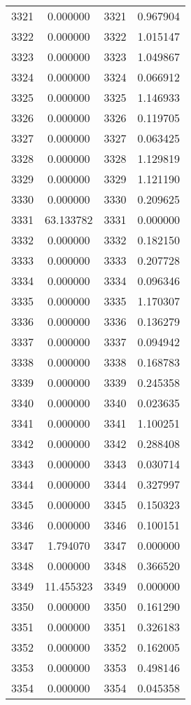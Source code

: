 \documentclass[12pt]{article}
\begin{document}
\begin{longtable}{@{}cccc@{}}
3321 & 0.000000 & 3321 & 0.967904 \\
3322 & 0.000000 & 3322 & 1.015147 \\
3323 & 0.000000 & 3323 & 1.049867 \\
3324 & 0.000000 & 3324 & 0.066912 \\
3325 & 0.000000 & 3325 & 1.146933 \\
3326 & 0.000000 & 3326 & 0.119705 \\
3327 & 0.000000 & 3327 & 0.063425 \\
3328 & 0.000000 & 3328 & 1.129819 \\
3329 & 0.000000 & 3329 & 1.121190 \\
3330 & 0.000000 & 3330 & 0.209625 \\
3331 & 63.133782 & 3331 & 0.000000 \\
3332 & 0.000000 & 3332 & 0.182150 \\
3333 & 0.000000 & 3333 & 0.207728 \\
3334 & 0.000000 & 3334 & 0.096346 \\
3335 & 0.000000 & 3335 & 1.170307 \\
3336 & 0.000000 & 3336 & 0.136279 \\
3337 & 0.000000 & 3337 & 0.094942 \\
3338 & 0.000000 & 3338 & 0.168783 \\
3339 & 0.000000 & 3339 & 0.245358 \\
3340 & 0.000000 & 3340 & 0.023635 \\
3341 & 0.000000 & 3341 & 1.100251 \\
3342 & 0.000000 & 3342 & 0.288408 \\
3343 & 0.000000 & 3343 & 0.030714 \\
3344 & 0.000000 & 3344 & 0.327997 \\
3345 & 0.000000 & 3345 & 0.150323 \\
3346 & 0.000000 & 3346 & 0.100151 \\
3347 & 1.794070 & 3347 & 0.000000 \\
3348 & 0.000000 & 3348 & 0.366520 \\
3349 & 11.455323 & 3349 & 0.000000 \\
3350 & 0.000000 & 3350 & 0.161290 \\
3351 & 0.000000 & 3351 & 0.326183 \\
3352 & 0.000000 & 3352 & 0.162005 \\
3353 & 0.000000 & 3353 & 0.498146 \\
3354 & 0.000000 & 3354 & 0.045358 \\

\end{longtable}
\end{document}
